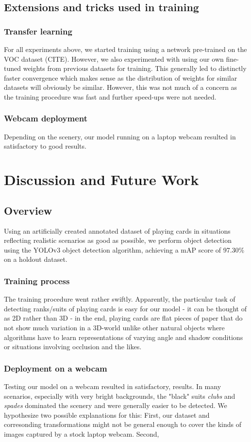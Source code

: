 \documentclass[a4paper]{article}
\begin{document}
\subsection*{Extensions and tricks used in training}
\subsubsection*{Transfer learning}
For all experiments above, we started training using a network pre-trained on the VOC dataset (CITE). However, we also experimented with using our own fine-tuned weights from previous datasets for training. This generally led to distinctly faster convergence which makes sense as the distribution of weights for similar datasets will obviously be similar. However, this was not much of a concern as the training procedure was fast and further speed-ups were not needed.
\subsubsection*{Webcam deployment}
Depending on the scenery, our model running on a laptop webcam resulted in satisfactory to good results.
\section{Discussion and Future Work}
\subsection{Overview}
Using an artificially created annotated dataset of playing cards in situations reflecting realistic scenarios as good as possible, we perform object detection using the YOLOv3 object detection algorithm, achieving a mAP score of 97.30\% on a holdout dataset. \\ 
\subsubsection*{Training process}
The training procedure went rather swiftly. Apparently,  the particular task of detecting ranks/suits of playing cards is easy for our model - it can be thought of as 2D rather than 3D - in the end, playing cards are flat pieces of paper that do not show much variation in a 3D-world unlike other natural objects where algorithms have to learn representations of varying angle and shadow conditions or situations involving occlusion and the likes. \\
\subsubsection*{Deployment on a webcam}
Testing our model on a webcam resulted in satisfactory,  results. In many scenarios, especially with very bright backgrounds, the "black" suits \textit{clubs} and \textit{spades} dominated the scenery and were generally easier to be detected. We hypothesize two possible explanations for this: First, our dataset and corresonding transformations might not be general enough to cover the kinds of images captured by a stock laptop webcam. Second,   
\end{document}
